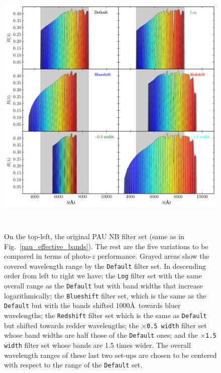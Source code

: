 \begin{figure}
\centering
\includegraphics[height=130mm]{./plots/pau_filt_sets.pdf}
\caption{On the top-left, the original PAU NB filter set (same as in Fig.~\ref{pau_effective_bands}). The rest are the five variations to be compared in terms of photo-$z$ performance. Grayed areas show the covered wavelength range by the \texttt{Default} filter set. In descending order from left to right we have: the \texttt{Log} filter set with the same overall range as the \texttt{Default} but with band widths that increase logarithmically; the \texttt{Blueshift} filter set, which is the same as the \texttt{Default} but with the bands shifted 1000\AA \ towards bluer wavelengths; the \texttt{Redshift} filter set which is the same as \texttt{Default} but shifted towards redder wavelengths; the \texttt{$\times$0.5 width} filter set whose band widths are half those of the \texttt{Default} ones; and the \texttt{$\times$1.5 width} filter set whose bands are 1.5 times wider. The overall wavelength ranges of these last two set-ups are chosen to be centered with respect to the range of the \texttt{Default} set.}
\label{pau_filt_sets}
\end{figure}

